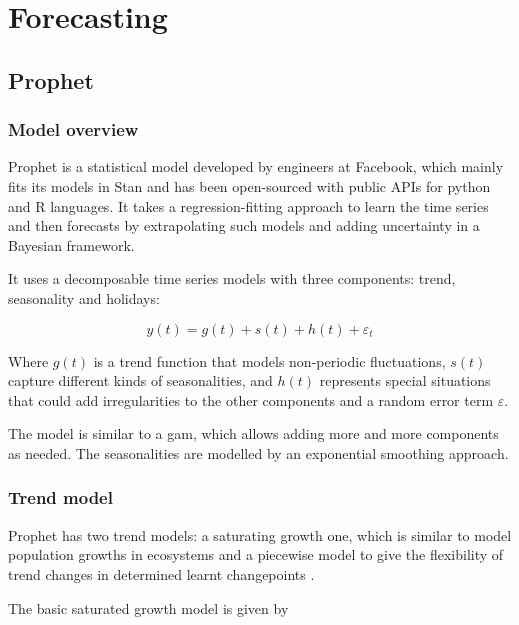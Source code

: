 
\chapter{Forecasting}
\label{cha:forecasting}

\section{Prophet}

\subsection{Model overview}

Prophet is a statistical model developed by engineers at Facebook, which mainly fits its models in Stan and has been open-sourced with public APIs for python and R languages\cite{fb_prophet}. It takes a regression-fitting approach to learn the time series and then forecasts by extrapolating such models and adding uncertainty in a Bayesian framework.

It uses a decomposable time series models \cite{harvey1990estimation} with three components: trend, seasonality and holidays:

\begin{equation}
	y(t) = g(t) + s(t) + h(t) + \varepsilon_t
\end{equation}

Where $g(t)$ is a trend function that models non-periodic fluctuations, $s(t)$ capture different kinds of seasonalities, and $h(t)$ represents special situations that could add irregularities to the other components and a random error term $\varepsilon$.

The model is similar to a \ac{gam}\cite{hastie1987generalized}, which allows adding more and more components as needed. The seasonalities are modelled by an exponential smoothing approach\cite{gardner1985exponential}.

\subsection{Trend model}

Prophet has two trend models: a saturating growth one, which is similar to model population growths in ecosystems \cite{hutchinson1978introduction} and a piecewise model to give the flexibility of trend changes in determined learnt changepoints \cite{fb_prophet}.

The basic saturated growth model is given by

